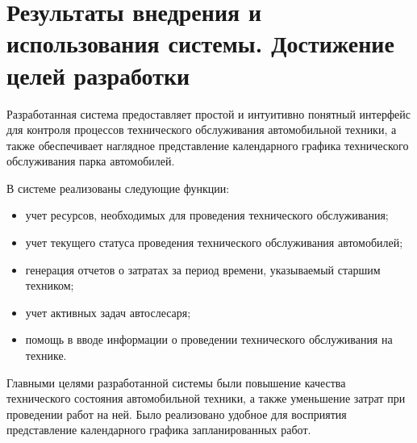 \chapter{Результаты внедрения и использования системы. Достижение целей
разработки}

Разработанная система предоставляет простой и интуитивно понятный интерфейс для
контроля процессов технического обслуживания автомобильной техники, а также
обеспечивает наглядное представление календарного графика технического
обслуживания парка автомобилей.

В системе реализованы следующие функции:
\begin{itemize}
  \item учет ресурсов, необходимых для проведения технического обслуживания;
  \item учет текущего статуса проведения технического обслуживания автомобилей;
  \item генерация отчетов о затратах за период времени, указываемый
    старшим техником;
  \item учет активных задач автослесаря;
  \item помощь в вводе информации о проведении технического обслуживания на
    технике.
\end{itemize}

Главными целями разработанной системы были повышение качества технического
состояния автомобильной техники, а также уменьшение затрат при проведении работ
на ней. Было реализовано удобное для восприятия представление календарного
графика запланированных работ.
